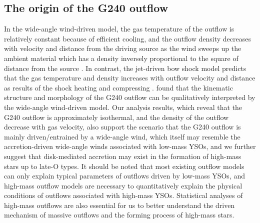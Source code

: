 \subsection{The origin of the G240 outflow}
In the wide-angle wind-driven model, the gas temperature of the outflow is relatively constant because of efficient cooling, and the outflow density decreases with velocity and distance from the driving source as the wind sweeps up the ambient material which has a density inversely proportional to the square of distance from the source \citep{1991ApJ...370L..31S, 2001ApJ...557..429L}. In contrast, the jet-driven bow shock model predicts that the gas temperature and density increases with outflow velocity and distance as results of the shock heating and compressing \citep{2001ApJ...557..429L}. \citet{2009ApJ...696...66Q} found that the kinematic structure and morphology of the G240 outflow can be qualitatively interpreted by the wide-angle wind-driven model. Our analysis results, which reveal that the G240 outflow is approximately isothermal, and the density of the outflow decrease with gas velocity, also support the scenario that the G240 outflow is mainly driven/entrained by a wide-angle wind, which itself may resemble the accretion-driven wide-angle winds \citep[X-wind or disk winds:][]{2006ApJ...649..845S, 2006MNRAS.365.1131P} associated with low-mass YSOs, and we further suggest that disk-mediated accretion may exist in the formation of high-mass stars up to late-O types. It should be noted that most existing outflow models can only explain typical parameters of outflows driven by low-mass YSOs, and high-mass outflow models are necessary to quantitatively explain the physical conditions of outflows associated with high-mass YSOs. Statistical analyses of high-mass outflows are also essential for us to better understand the driven mechanism of massive outflows and the forming process of high-mass stars.
